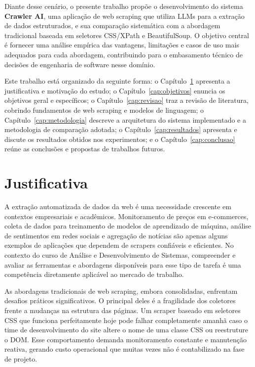 \documentclass[tcc,capa]{texifsul}
\begin{document}
Diante desse cenário, o presente trabalho propõe o desenvolvimento do sistema \textbf{Crawler AI}, uma aplicação de web scraping que utiliza LLMs para a extração de dados estruturados, e sua comparação sistemática com a abordagem tradicional baseada em seletores CSS/XPath e BeautifulSoup. O objetivo central é fornecer uma análise empírica das vantagens, limitações e casos de uso mais adequados para cada abordagem, contribuindo para o embasamento técnico de decisões de engenharia de software nesse domínio.

Este trabalho está organizado da seguinte forma: o Capítulo~\ref{cap:justificativa} apresenta a justificativa e motivação do estudo; o Capítulo~\ref{cap:objetivos} enuncia os objetivos geral e específicos; o Capítulo~\ref{cap:revisao} traz a revisão de literatura, cobrindo fundamentos de web scraping e modelos de linguagem; o Capítulo~\ref{cap:metodologia} descreve a arquitetura do sistema implementado e a metodologia de comparação adotada; o Capítulo~\ref{cap:resultados} apresenta e discute os resultados obtidos nos experimentos; e o Capítulo~\ref{cap:conclusao} reúne as conclusões e propostas de trabalhos futuros.

\chapter{Justificativa}
\label{cap:justificativa}

A extração automatizada de dados da web é uma necessidade crescente em contextos empresariais e acadêmicos. Monitoramento de preços em e-commerces, coleta de dados para treinamento de modelos de aprendizado de máquina, análise de sentimentos em redes sociais e agregação de notícias são apenas alguns exemplos de aplicações que dependem de scrapers confiáveis e eficientes. No contexto do curso de Análise e Desenvolvimento de Sistemas, compreender e avaliar as ferramentas e abordagens disponíveis para esse tipo de tarefa é uma competência diretamente aplicável ao mercado de trabalho.

As abordagens tradicionais de web scraping, embora consolidadas, enfrentam desafios práticos significativos. O principal deles é a fragilidade dos coletores frente a mudanças na estrutura das páginas. Um scraper baseado em seletores CSS que funciona perfeitamente hoje pode falhar completamente amanhã caso o time de desenvolvimento do site altere o nome de uma classe CSS ou reestruture o DOM. Esse comportamento demanda monitoramento constante e manutenção reativa, gerando custo operacional que muitas vezes não é contabilizado na fase de projeto.
\end{document}
